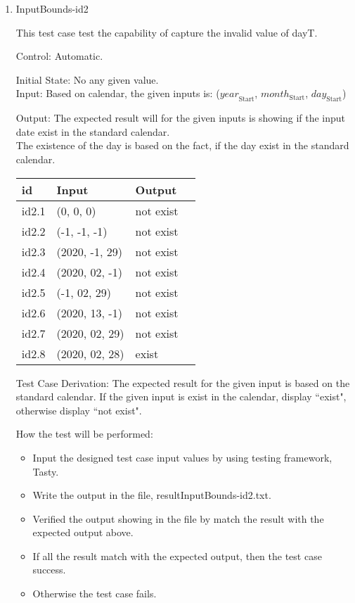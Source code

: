 \documentclass[12pt, titlepage]{article}
\begin{document}
\begin{enumerate}
\item{InputBounds-id2\\}

This test case test the capability of capture the invalid value of dayT.

Control: Automatic. 
  
Initial State: No any given value.\\

Input: Based on calendar, the given inputs is: 
($\mathit{year}_\text{Start}$, $\mathit{month}_\text{Start}$, $\mathit{day}_\text{Start}$)

Output: The expected result will for the given inputs is showing if the input date exist in the standard calendar.\\
The existence of the day is based on the fact, if the day exist in the standard calendar.

\noindent \begin{tabular}{l l l l} 
    \toprule		
    \textbf{id} & \textbf{Input} & \textbf{Output}\\ 
	\midrule
   id2.1 & (0, 0, 0) & not exist\\
   id2.2 & (-1, -1, -1)  & not exist\\
   id2.3 & (2020, -1, 29)  & not exist\\
   id2.4 & (2020, 02, -1)  & not exist\\
   id2.5 & (-1, 02, 29)  & not exist\\
   id2.6 & (2020, 13, -1)  & not exist\\
   id2.7 & (2020, 02, 29)  & not exist\\
   id2.8 & (2020, 02, 28)  & exist\\
    \bottomrule
  \end{tabular}
 

Test Case Derivation: The expected result for the given input is based on the standard calendar. If the given input is exist in the calendar, display ``exist", otherwise display ``not exist". \\


How the test will be performed:
\begin{itemize} 
\item Input the designed test case input values by using testing framework, Tasty. 
\item Write the output in the file, resultInputBounds-id2.txt.
\item Verified the output showing in the file by match the result with the expected output above.
\item If all the result match with the expected output, then the test case success.
\item Otherwise the test case fails.
\end{itemize}


\end{enumerate}
\end{document}
